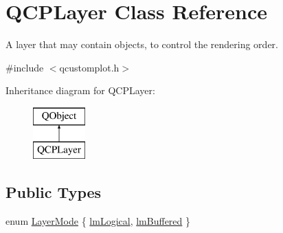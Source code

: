 \hypertarget{class_q_c_p_layer}{}\section{Q\+C\+P\+Layer Class Reference}
\label{class_q_c_p_layer}


A layer that may contain objects, to control the rendering order.  




{\ttfamily \#include $<$qcustomplot.\+h$>$}

Inheritance diagram for Q\+C\+P\+Layer\+:\begin{figure}[H]
\begin{center}
\leavevmode
\includegraphics[height=2.000000cm]{d9/dfe/class_q_c_p_layer}
\end{center}
\end{figure}
\subsection*{Public Types}
\begin{DoxyCompactItemize}
\item 
enum \mbox{\hyperlink{class_q_c_p_layer_a67dcfc1590be2a1f2227c5a39bb59c7c}{Layer\+Mode}} \{ \mbox{\hyperlink{class_q_c_p_layer_a67dcfc1590be2a1f2227c5a39bb59c7ca02eb5e9a4cb7f1baf1e2b6b99e3b87ce}{lm\+Logical}}, 
\mbox{\hyperlink{class_q_c_p_layer_a67dcfc1590be2a1f2227c5a39bb59c7cab581b9fab3007c4c65f057f4185d7538}{lm\+Buffered}}
 \}
\end{DoxyCompactItemize}
